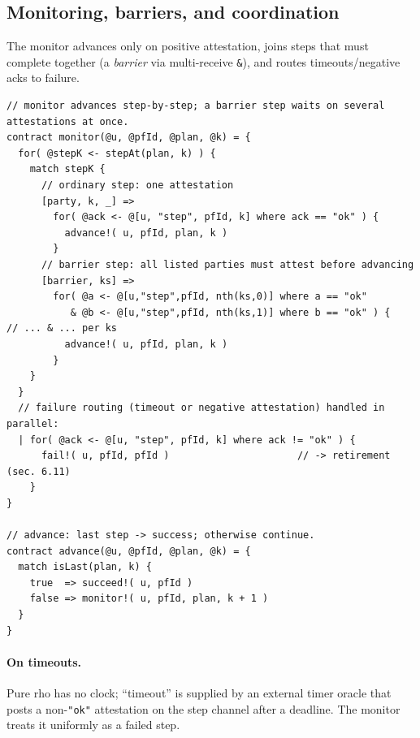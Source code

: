 \documentclass[11pt]{article}
\newcommand{\code}[1]{\lstinline[language=rho,basicstyle=\ttfamily\small]|#1|}
\begin{document}
\subsection{Monitoring, barriers, and coordination}\label{sec:monitor}
The monitor advances only on positive attestation, joins steps that must complete together (a
\emph{barrier} via multi-receive \code{&}), and routes timeouts/negative acks to failure.
\begin{lstlisting}[language=rho]
// monitor advances step-by-step; a barrier step waits on several attestations at once.
contract monitor(@u, @pfId, @plan, @k) = {
  for( @stepK <- stepAt(plan, k) ) {
    match stepK {
      // ordinary step: one attestation
      [party, k, _] =>
        for( @ack <- @[u, "step", pfId, k] where ack == "ok" ) {
          advance!( u, pfId, plan, k )
        }
      // barrier step: all listed parties must attest before advancing
      [barrier, ks] =>
        for( @a <- @[u,"step",pfId, nth(ks,0)] where a == "ok"
           & @b <- @[u,"step",pfId, nth(ks,1)] where b == "ok" ) {     // ... & ... per ks
          advance!( u, pfId, plan, k )
        }
    }
  }
  // failure routing (timeout or negative attestation) handled in parallel:
  | for( @ack <- @[u, "step", pfId, k] where ack != "ok" ) {
      fail!( u, pfId, pfId )                      // -> retirement (sec. 6.11)
    }
}

// advance: last step -> success; otherwise continue.
contract advance(@u, @pfId, @plan, @k) = {
  match isLast(plan, k) {
    true  => succeed!( u, pfId )
    false => monitor!( u, pfId, plan, k + 1 )
  }
}
\end{lstlisting}

\paragraph{On timeouts.} Pure rho has no clock; ``timeout'' is supplied by an external timer oracle
that posts a non-\code{"ok"} attestation on the step channel after a deadline. The monitor treats it
uniformly as a failed step.
\end{document}
